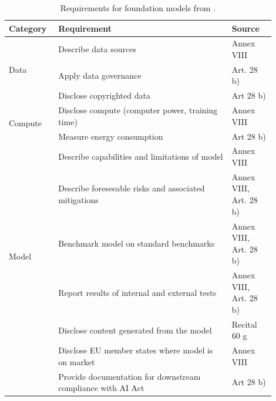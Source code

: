 \renewcommand\arraystretch{1.3}
\begin{table}
    \centering
    \begin{longtable}{p{0.15\linewidth}|p{0.6\linewidth}p{0.15\linewidth}}  
        \hline
         \textbf{Category}  & \textbf{Requirement}                                              & \textbf{Source}  \\
         \hline \hline
         \multirow{3}{=}{Data}
                            & Describe data sources                                             &  Annex VIII \\
                            & Apply data governance                                             &  Art. 28 b)\\
                            & Disclose copyrighted data                                         &  Art 28 b) \\
         \hline
         \multirow{2}{=}{Compute}
                            & Disclose compute (computer power, training time)                  &  Annex VIII \\
                            & Measure energy consumption                                        &  Art 28 b) \\
         \hline 
         \multirow{6}{=}{Model}
                            & Describe capabilities and limitations of model                    &  Annex VIII \\
                            & Describe foreseeable risks and associated mitigations             &  Annex VIII, Art. 28 b) \\
                            & Benchmark model on standard benchmarks                            &  Annex VIII, Art. 28 b)  \\
                            & Report results of internal and external tests                     &  Annex VIII, Art. 28 b)  \\
         \hline 
         \multirow{4}{=}{Deployment}
                            & Disclose content generated from the model                         &  Recital 60 g \\
                            & Disclose EU member states where model is on market                &  Annex VIII \\
                            & Provide documentation for downstream compliance with AI Act       &  Art 28 b) \\
         \hline 
    \end{longtable}
    \caption{Requirements for foundation models from \cite{bommasani2023eu-ai-act}.}
    \label{tab:stanford_llm_audit}
\end{table}

